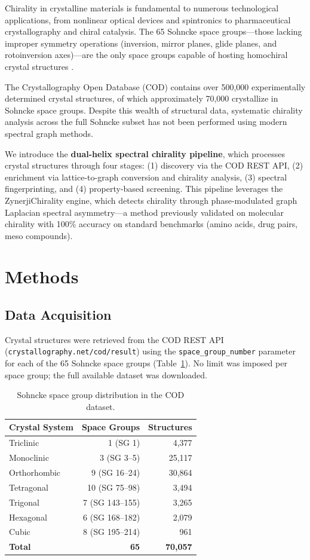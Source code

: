 \documentclass[11pt,a4paper]{article}
\begin{document}
Chirality in crystalline materials is fundamental to numerous technological applications, from nonlinear optical devices and spintronics to pharmaceutical crystallography and chiral catalysis. The 65 Sohncke space groups---those lacking improper symmetry operations (inversion, mirror planes, glide planes, and rotoinversion axes)---are the only space groups capable of hosting homochiral crystal structures \cite{flack2003}.

The Crystallography Open Database (COD) contains over 500,000 experimentally determined crystal structures, of which approximately 70,000 crystallize in Sohncke space groups. Despite this wealth of structural data, systematic chirality analysis across the full Sohncke subset has not been performed using modern spectral graph methods.

We introduce the \textbf{dual-helix spectral chirality pipeline}, which processes crystal structures through four stages: (1) discovery via the COD REST API, (2) enrichment via lattice-to-graph conversion and chirality analysis, (3) spectral fingerprinting, and (4) property-based screening. This pipeline leverages the ZynerjiChirality engine, which detects chirality through phase-modulated graph Laplacian spectral asymmetry---a method previously validated on molecular chirality with 100\% accuracy on standard benchmarks (amino acids, drug pairs, meso compounds).

\section{Methods}

\subsection{Data Acquisition}

Crystal structures were retrieved from the COD REST API (\texttt{crystallography.net/cod/result}) using the \texttt{space\_group\_number} parameter for each of the 65 Sohncke space groups (Table~\ref{tab:sohncke}). No limit was imposed per space group; the full available dataset was downloaded.

\begin{table}[H]
\centering
\caption{Sohncke space group distribution in the COD dataset.}
\label{tab:sohncke}
\begin{tabular}{lrr}
\toprule
Crystal System & Space Groups & Structures \\
\midrule
Triclinic & 1 (SG 1) & 4,377 \\
Monoclinic & 3 (SG 3--5) & 25,117 \\
Orthorhombic & 9 (SG 16--24) & 30,864 \\
Tetragonal & 10 (SG 75--98) & 3,494 \\
Trigonal & 7 (SG 143--155) & 3,265 \\
Hexagonal & 6 (SG 168--182) & 2,079 \\
Cubic & 8 (SG 195--214) & 961 \\
\midrule
\textbf{Total} & \textbf{65} & \textbf{70,057} \\
\bottomrule
\end{tabular}
\end{table}
\end{document}
